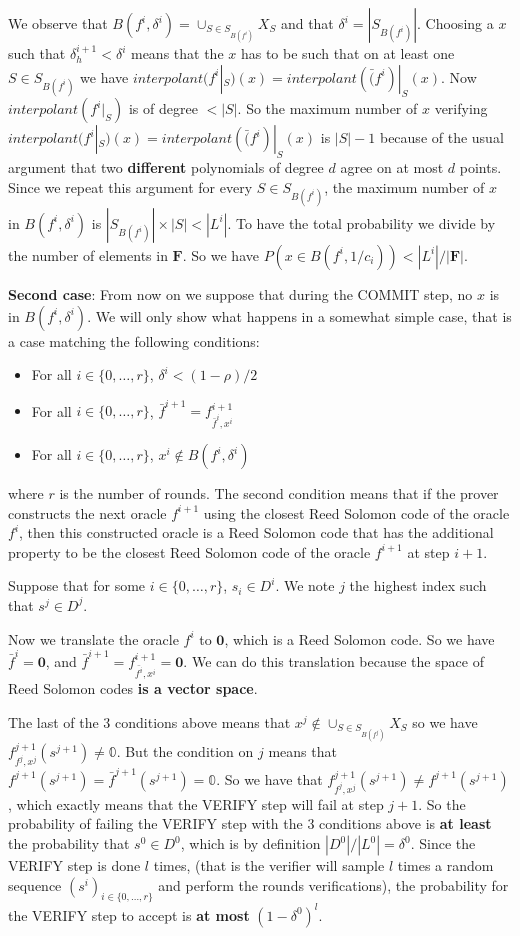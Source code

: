 \documentclass[12pt]{extarticle}
\newcommand{\<}{\langle}
\renewcommand{\>}{\rangle}
\theoremstyle{definition}
\begin{document}
We observe that $B(f^i,\delta^i)=\cup_{S\in S_{B(f^i)}}X_S$ and that $\delta^i=|S_{B(f^i)}|$. Choosing a $x$ such that $\delta^{i+1}_h<\delta^i$ means that the $x$ has to be such that on at least one $S\in S_{B(f^i)}$ we have $interpolant(f^i|_S)(x)=interpolant(\bar(f^i)|_S(x)$. Now $interpolant(f^i|_S)$ is of degree $<|S|$. So the maximum number of $x$ verifying $interpolant(f^i|_S)(x)=interpolant(\bar(f^i)|_S(x)$ is $|S|-1$ because of the usual argument that two \textbf{different} polynomials of degree $d$ agree on at most $d$ points. Since we repeat this argument for every $S\in S_{B(f^i)}$, the maximum number of $x$ in $B(f^i,\delta^i)$ is $|S_{B(f^i)}|\times|S|<|L^i|$. To have the total probability we divide by the number of elements in $\mathbf{F}$. So we have $P(x\in B(f^i,1/c_i))<|L^i|/|\mathbf{F}|$.

\textbf{Second case}: From now on we suppose that during the COMMIT step, no $x$ is in $B(f^i,\delta^i)$. We will only show what happens in a somewhat simple case, that is a case matching the following conditions:
\begin{itemize}
    \item For all $i\in\{0,\dots,r\}$, $\delta^i<(1-\rho)/2$
    \item For all $i\in\{0,\dots,r\}$, $\bar{f}^{i+1}=f^{i+1}_{\bar{f}^i,x^i}$
    \item For all $i\in\{0,\dots,r\}$, $x^i\not\in B(f^i,\delta^i)$
\end{itemize}
where $r$ is the number of rounds. The second condition means that if the prover constructs the next oracle $f^{i+1}$ using the closest Reed Solomon code of the oracle $f^i$, then this constructed oracle is a Reed Solomon code that has the additional property to be the closest Reed Solomon code of the oracle $f^{i+1}$ at step $i+1$.

Suppose that for some $i\in\{0,\dots,r\}$, $s_i\in D^i$. We note $j$ the highest index such that $s^j\in D^j$.

Now we translate the oracle $f^i$ to $\mathbf{0}$, which is a Reed Solomon code. So we have $\bar{f}^i=\mathbf{0}$, and $\bar{f}^{i+1}=f^{i+1}_{\bar{f^i},x^i}=\mathbf{0}$. We can do this translation because the space of Reed Solomon codes \textbf{is a vector space}.

The last of the $3$ conditions above means that $x^{j}\not\in\cup_{S\in S_{B(f^{j})}}X_S$ so we have $f^{j+1}_{f^j,x^j}(s^{j+1})\neq\mathbb{0}$. But the condition on $j$ means that $f^{j+1}(s^{j+1})=\bar{f}^{j+1}(s^{j+1})=\mathbb{0}$. So we have that $f^{j+1}_{f^j,x^j}(s^{j+1})\neq f^{j+1}(s^{j+1})$, which exactly means that the VERIFY step will fail at step $j+1$. So the probability of failing the VERIFY step with the $3$ conditions above is \textbf{at least} the probability that $s^0\in D^0$, which is by definition $|D^0|/|L^0|=\delta^0$. Since the VERIFY step is done $l$ times, (that is the verifier will sample $l$ times a random sequence $(s^i)_{i\in\{0,\dots,r\}}$ and perform the rounds verifications), the probability for the VERIFY step to accept is \textbf{at most} $(1-\delta^0)^l$.
\end{document}
